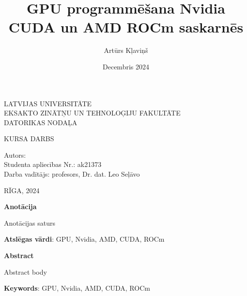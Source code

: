 \documentclass[12pt]{report}%
\author{Artūrs Kļaviņš}
\title{GPU programmēšana Nvidia CUDA un AMD ROCm saskarnēs}
\date{Decembris 2024}
\theoremstyle{definition}
\def\degree{Kursa darbs}
\def\faculty{Eksakto zinātņu un tehnoloģiju fakultāte}
\def\department{Datorikas nodaļa}
\def\vietlaiks{Rīga, 2024}
\def\supervisor{Darba vadītājs: profesors, Dr. dat. Leo Seļāvo}
\def\studaplieciba{ak21373}
\begin{document}
\thispagestyle{empty}
\makeatletter
   \begin{center}
       \vspace*{1cm}
        
    \vspace{10mm}
    {\Large LATVIJAS UNIVERSITĀTE\\
    \MakeUppercase{\faculty}\\
    \vspace{2mm}
    \MakeUppercase{\department}
    }
    \vspace*{10mm}
    
    
    
    \vspace{5mm}
    {\Large \MakeUppercase{\textbf{\@title}}}
    \vspace{5mm}
    

       \vspace{1cm}
    \Large
    \MakeUppercase{\degree}
    \end{center}
    \vspace{3cm}
    \begin{flushleft}
    \large
       Autors: \textbf{\large \@author}\\
       Studenta apliecības Nr.: \studaplieciba \\
       \supervisor
    \end{flushleft}

       \vfill
     
    \begin{center}
    \Large      
    \MakeUppercase{\vietlaiks}
   \end{center}
\makeatother

\newpage




\thispagestyle{empty}
\noindent \textbf{Anotācija}

\noindent Anotācijas saturs


\vspace{4mm}
\noindent \textbf{Atslēgas vārdi}: GPU, Nvidia, AMD, CUDA, ROCm

\vspace{20mm}
\noindent \textbf{Abstract}

\noindent Abstract body

\vspace{4mm}
\noindent \textbf{Keywords}: GPU, Nvidia, AMD, CUDA, ROCm

\newpage
\tableofcontents
\newpage

\end{document}
